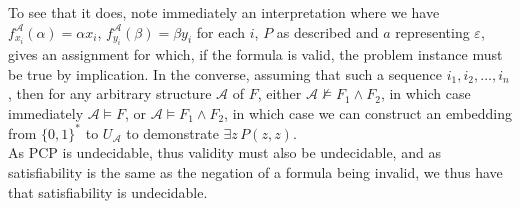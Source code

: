 \documentclass{tikzposter} %
\newtheorem{definition}{Definition}
\begin{document}
\begin{columns}
{{      To see that it does, note immediately an interpretation where we have $f_{x_{i}}^{\mathcal{A}}(\alpha) = \alpha x_{i}$, $f^{\mathcal{A}}_{y_{i}}(\beta) = \beta y_{i}$ for each $i$, $P$ as described and $a$ representing $\varepsilon$, gives an assignment for which, if the formula is valid, the problem instance must be true by implication. In the converse, assuming that such a sequence $i_{1},i_{2},\dots,i_{n}$, then for any arbitrary structure $\mathcal{A}$ of $F$, either $\mathcal{A} \nvDash F_{1} \land F_{2}$, in which case immediately $\mathcal{A} \vDash F$, or $\mathcal{A} \vDash F_{1} \land F_{2}$, in which case we can construct an embedding from $\{0,1\}^{*}$ to $U_{\mathcal{A}}$ to demonstrate $\exists z \, P(z,z)$. \\

      As PCP is undecidable, thus validity must also be undecidable, and as satisfiability is the same as the negation of a formula being invalid, we thus have that satisfiability is undecidable.
      }
    }

\end{columns}
\end{document}
